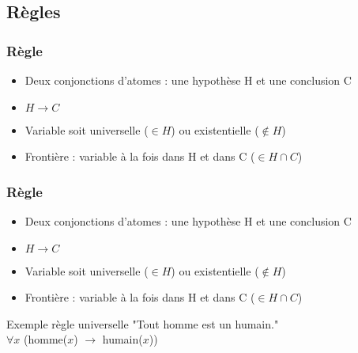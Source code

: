 
\subsection{Règles}
\begin{frame}
	\frametitle{Règle}
	\begin{center}
	\begin{itemize}
		\item Deux conjonctions d'atomes : une hypothèse H et une conclusion C
		\item $H \rightarrow C$
		\item Variable soit universelle ($\in H$) ou existentielle ($\notin H$)
		\item Frontière : variable à la fois dans H et dans C ($\in H \cap C$)\\
	\end{itemize}
	\end{center}
\end{frame}

\begin{frame}
	\frametitle{Règle}
	\begin{center}
	\begin{itemize}
		\item Deux conjonctions d'atomes : une hypothèse H et une conclusion C
		\item $H \rightarrow C$
		\item Variable soit universelle ($\in H$) ou existentielle ($\notin H$)
		\item Frontière : variable à la fois dans H et dans C ($\in H \cap C$)\\
	\end{itemize}

	\begin{exampleblock}{Exemple règle universelle}
		"Tout homme est un humain."\\
		$\forall x$ (homme($x$) $\rightarrow$ humain($x$))
	\end{exampleblock}

	\end{center}
\end{frame}

